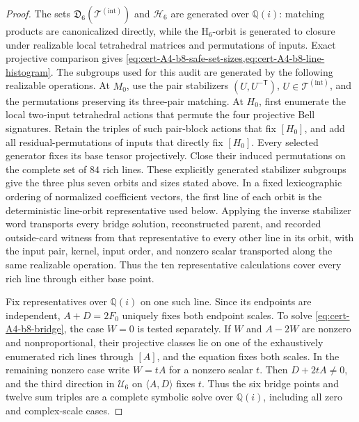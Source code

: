 \documentclass[11pt,letterpaper,onecolumn]{article}
\theoremstyle{plain}
\theoremstyle{definition}
\theoremstyle{remark}
\newcommand{\TetInt}{{\mathcal T^{(\mathrm{int})}}}
\newcommand{\Hcore}{\mathrm{H}_6}
\begin{document}
\begin{proof}
The sets \(\mathfrak D_6(\TetInt)\) and \(\mathscr H_6\) are generated over \(\mathbb Q(i)\): matching products are
canonicalized directly, while the \(\Hcore\)-orbit is generated to closure
under realizable local tetrahedral matrices and permutations of inputs.  Exact
projective comparison gives 
\cref{eq:cert-A4-b8-safe-set-sizes,eq:cert-A4-b8-line-histogram}.  The
subgroups used for this audit are generated by the following realizable
operations.  At \(M_0\), use the pair stabilizers
\((U,U^{-\mathsf T})\), \(U\in\TetInt\), and the permutations
preserving its three-pair matching.  At \(H_0\), first enumerate the local
two-input tetrahedral actions that permute the four projective Bell
signatures.  Retain the triples of such pair-block actions that fix
\([H_0]\), and add all residual-permutations of inputs that directly fix
\([H_0]\).  Every selected generator fixes its base tensor projectively.
Close their induced permutations on the complete set of \(84\) rich lines.
These explicitly generated stabilizer subgroups give the three plus
seven orbits and sizes stated above.  In a fixed lexicographic ordering of normalized
coefficient vectors, the first line of each orbit is the deterministic
line-orbit representative used below.
Applying the inverse stabilizer word transports every bridge solution,
reconstructed parent, and recorded outside-card witness from that
representative to every other line in its orbit, with the input pair,
kernel, input order, and nonzero scalar transported along the same realizable
operation.  Thus the ten representative calculations cover every rich line
through either base point.

Fix representatives over \(\mathbb Q(i)\) on one such line.  Since its
endpoints are independent, \(A+D=2F_0\) uniquely fixes both endpoint
scales.  To solve \cref{eq:cert-A4-b8-bridge}, the case \(W=0\) is tested
separately.  If \(W\) and \(A-2W\) are nonzero and nonproportional, their
projective classes lie on one of the exhaustively enumerated rich lines
through \([A]\), and the equation fixes both scales.  In the remaining nonzero case write \(W=tA\)
for a nonzero scalar \(t\).
Then \(D+2tA\ne0\), and the third direction in \(\mathscr U_6\) on
\(\langle A,D\rangle\) fixes \(t\).  Thus the six bridge points and twelve
sum triples are a complete symbolic solve over \(\mathbb Q(i)\), including
all zero and complex-scale cases.


\end{proof}
\end{document}
